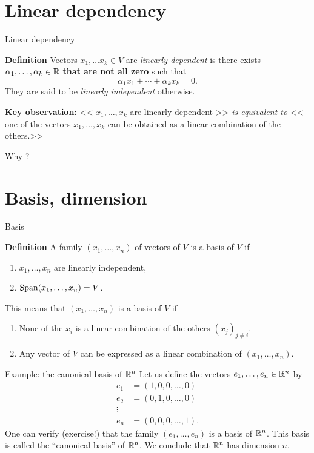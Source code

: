 \documentclass{beamer}
\begin{document}
\section{Linear dependency}

\begin{frame}[t]{Linear dependency}
	\begin{block}{\bf Definition}
		Vectors $x_1, \dots x_k \in V$ are \emph{linearly dependent} is there exists $\alpha_1, \dots, \alpha_k \in \mathbb{R}$ \textbf{that are not all zero} such that 
		$$
		\alpha_1 x_1 + \cdots + \alpha_k x_k = 0.
		$$
		They are said to be \emph{linearly independent} otherwise.
	\end{block}

	\vspace{0.5cm}

	\textbf{Key observation:}
<< $x_1, \dots, x_k$ are linearly dependent >>
\emph{is equivalent to}
<< one of the vectors $x_1, \dots, x_k$ can be obtained as a linear combination of the others.>>
\end{frame}
\begin{frame}[t]{Why ?}
\end{frame}

\section{Basis, dimension}

\begin{frame}[t]{Basis}
	\begin{block}{\bf Definition}
	A family $(x_1, \dots, x_n)$ of vectors of $V$ is a basis of $V$ if
	\begin{enumerate}
		\item $x_1, \dots, x_n$ are linearly independent,
		\item ${{\rm Span}}(x_1, \dots, x_n) = V$.
	\end{enumerate}
	\end{block}
	\vspace{0.5cm}
	This means that $(x_1, \dots, x_n)$ is a basis of $V$ if
	\begin{enumerate}
		\item None of the $x_i$ is a linear combination of the others $(x_j)_{j \neq i}$.
		\item Any vector of $V$ can be expressed as a linear combination of $(x_1, \dots, x_n)$.
	\end{enumerate}
\end{frame}

\begin{frame}{Example: the canonical basis of $\mathbb{R}^n$}
	Let us define the vectors $e_1, \dots, e_n \in \mathbb{R}^n$ by
	\begin{align*}
		e_1 &= (1, 0, 0, \dots, 0) \\
		e_2 &= (0, 1, 0, \dots, 0) \\
		\vdots & \\
		e_n &= (0, 0, 0, \dots, 1).
	\end{align*}
	One can verify (exercise!) that the family $(e_1, \dots, e_n)$ is a basis of $\mathbb{R}^n$. This basis is called the ``canonical basis'' of $\mathbb{R}^n$. We conclude that $\mathbb{R}^n$ has dimension $n$.
\end{frame}
\end{document}
